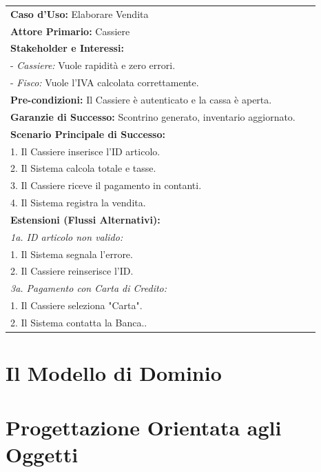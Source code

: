 \documentclass[10pt, a4paper]{article}
\begin{document}
\begin{minipage}[t]{0.48\textwidth}
    \vspace{0pt} %
    \begin{tabular}{|p{0.95\linewidth}|}
        \hline
        \textbf{Caso d'Uso:} Elaborare Vendita \\
        \textbf{Attore Primario:} Cassiere \\
        \hline
        \textbf{Stakeholder e Interessi:} \\
        - \textit{Cassiere:} Vuole rapidità e zero errori. \\
        - \textit{Fisco:} Vuole l'IVA calcolata correttamente. \\
        \hline
        \textbf{Pre-condizioni:} Il Cassiere è autenticato e la cassa è aperta. \\
        \textbf{Garanzie di Successo:} Scontrino generato, inventario aggiornato. \\
        \hline
        \textbf{Scenario Principale di Successo:} \\
        1. Il Cassiere inserisce l'ID articolo. \\
        2. Il Sistema calcola totale e tasse. \\
        3. Il Cassiere riceve il pagamento in contanti. \\
        4. Il Sistema registra la vendita. \\
        \hline
        \textbf{Estensioni (Flussi Alternativi):} \\
        \textit{1a. ID articolo non valido:} \\
        \hspace{0.3cm} 1. Il Sistema segnala l'errore. \\
        \hspace{0.3cm} 2. Il Cassiere reinserisce l'ID. \\
        \textit{3a. Pagamento con Carta di Credito:} \\
        \hspace{0.3cm} 1. Il Cassiere seleziona "Carta". \\
        \hspace{0.3cm} 2. Il Sistema contatta la Banca.. \\
        \hline
    \end{tabular}
\end{minipage}


\section{Il Modello di Dominio}

\section{Progettazione Orientata agli Oggetti}
\end{document}
